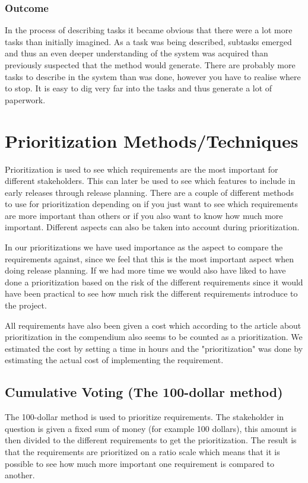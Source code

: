 \documentclass[a4paper]{article}
\begin{document}
			\subsubsection{Outcome}	
				In the process of describing tasks it became obvious that there were a lot more tasks than initially imagined. As a task was being described, subtasks emerged and thus an even deeper understanding of the system was acquired than previously suspected that the method would generate. There are probably more tasks to describe in the system than was done, however you have to realise where to stop. It is easy to dig very far into the tasks and thus generate a lot of paperwork.

	\section{Prioritization Methods/Techniques}
	Prioritization is used to see which requirements are the most important for different stakeholders. This can later be used to see which features to include in early releases through release planning. There are a couple of different methods to use for prioritization depending on if you just want to see which requirements are more important than others or if you also want to know how much more important. Different aspects can also be taken into account during prioritization. 
	
	In our prioritizations we have used importance as the aspect to compare the requirements against, since we feel that this is the most important aspect when doing release planning. If we had more time we would also have liked to have done a prioritization based on the risk of the different requirements since it would have been practical to see how much risk the different requirements introduce to the project.
	
	All requirements have also been given a cost which according to the article about prioritization in the compendium also seems to be counted as a prioritization. We estimated the cost by setting a time in hours and the "prioritization" was done by estimating the actual cost of implementing the requirement.

	\subsection{Cumulative Voting (The 100-dollar method)}
		The 100-dollar method is used to prioritize requirements. The stakeholder in question is given a fixed sum of money (for example 100 dollars), this amount is then divided to the different requirements to get the prioritization. The result is that the requirements are prioritized on a ratio scale which means that it is possible to see how much more important one requirement is compared to another.   
\end{document}
